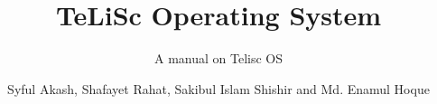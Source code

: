 \documentclass[graybox,envcountchap,sectrefs]{svmono}
\begin{document}
\author{Syful Akash, Shafayet Rahat, Sakibul Islam Shishir and Md. Enamul Hoque}
\title{TeLiSc Operating System}
\subtitle{A manual on Telisc OS}
\maketitle

\frontmatter%






\tableofcontents




\mainmatter%
%









\backmatter%



\printindex

\end{document}
